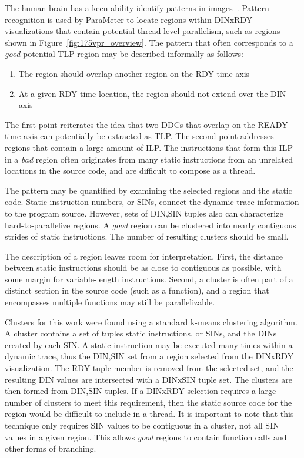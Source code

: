 \documentclass[defaultstyle,11pt]{thesis}
\begin{document}
The human brain has a keen ability identify patterns in
images~\cite{biederman:87:pr}. Pattern recognition is used by
ParaMeter to locate regions within DINxRDY visualizations that contain
potential thread level parallelism, such as regions shown in
Figure~\ref{fig:175vpr_overview}. The pattern that often corresponds
to a \textit{good} potential TLP region may be described informally as
follows:

\begin{enumerate}
\item The region should overlap another region on the RDY time axis
\item At a given RDY time location, the region should not extend over
  the DIN axis
\end{enumerate}

The first point reiterates the idea that two DDCs that overlap on the
READY time axis can potentially be extracted as TLP.  The second point
addresses regions that contain a large amount of ILP.  The instructions
that form this ILP in a \textit{bad} region often originates from many
static instructions from an unrelated locations in the source code, and
are difficult to compose as a thread.

The pattern may be quantified by examining the selected regions and
the static code.  Static instruction numbers, or SINs, connect the
dynamic trace information to the program source.  However, sets of
{DIN,SIN} tuples also can characterize hard-to-parallelize regions. A
\textit{good} region can be clustered into nearly contiguous strides
of static instructions. The number of resulting clusters should be
small.

The description of a  region leaves room for
interpretation.  First, the distance between static instructions
should be as close to contiguous as possible, with some margin for
variable-length instructions. Second, a cluster is often part of a
distinct section in the source code (such as a function), and a region
that encompasses multiple functions may still be parallelizable.

Clusters for this work were found using a standard k-means clustering
algorithm.  A cluster contains a set of tuples static instructions, or
SINs, and the DINs created by each SIN.  A static instruction may be
executed many times within a dynamic trace, thus the {DIN,SIN} set
from a region selected from the DINxRDY visualization. The RDY tuple
member is removed from the selected set, and the resulting DIN values
are intersected with a DINxSIN tuple set.  The clusters are then
formed from {DIN,SIN} tuples.  If a DINxRDY selection requires a large
number of clusters to meet this requirement, then the static source
code for the region would be difficult to include in a thread.  It is
important to note that this technique only requires SIN values to be
contiguous in a cluster, not all SIN values in a given region.  This
allows \textit{good} regions to contain function calls and other
forms of branching.
\end{document}
